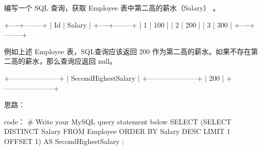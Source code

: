 编写一个 SQL 查询，获取 Employee 表中第二高的薪水（Salary） 。

+----+--------+
| Id | Salary |
+----+--------+
| 1  | 100    |
| 2  | 200    |
| 3  | 300    |
+----+--------+

例如上述 Employee 表，SQL查询应该返回 200 作为第二高的薪水。如果不存在第二高的薪水，那么查询应返回 null。

+---------------------+
| SecondHighestSalary |
+---------------------+
| 200                 |
+---------------------+




























思路：



























code：
# Write your MySQL query statement below
SELECT 
    (SELECT DISTINCT 
        Salary 
     FROM 
        Employee 
     ORDER BY Salary DESC 
     LIMIT 1 OFFSET 1) AS SecondHighestSalary ;
